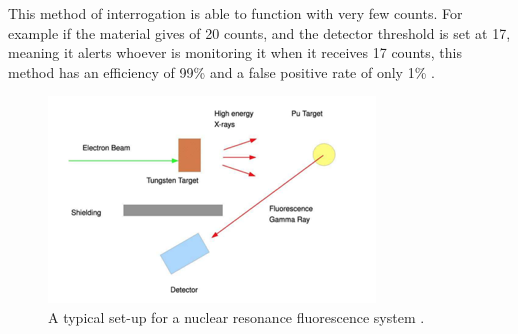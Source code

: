 \documentclass{report}
\begin{document}
This method of interrogation is able to function with very few counts. For example if the material gives of 20 counts, and the detector threshold is set at 17, meaning it alerts whoever is monitoring it when it receives 17 counts, this method has an efficiency of 99\% and a false positive rate of only 1\% \cite{Chichester2009}. 

\begin{figure}
 \centering
 \includegraphics[trim = 0cm 0cm 0cm 0cm, clip,scale=0.7]{./figures/NRF_setup.png}
   \caption{A typical set-up for  a nuclear resonance fluorescence system \cite{Morse2014a}.}
     \label{fig:NRF_setup}
\end{figure}
\end{document}
